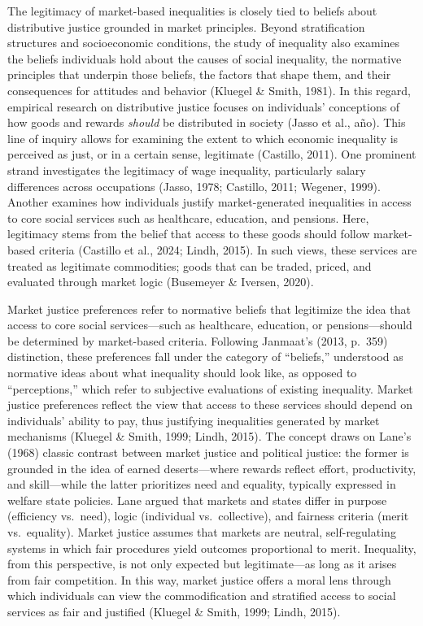 \documentclass[
  12pt,
]{article}
\begin{document}
The legitimacy of market-based inequalities is closely tied to beliefs
about distributive justice grounded in market principles. Beyond
stratification structures and socioeconomic conditions, the study of
inequality also examines the beliefs individuals hold about the causes
of social inequality, the normative principles that underpin those
beliefs, the factors that shape them, and their consequences for
attitudes and behavior (Kluegel \& Smith, 1981). In this regard,
empirical research on distributive justice focuses on individuals'
conceptions of how goods and rewards \emph{should} be distributed in
society (Jasso et al., año). This line of inquiry allows for examining
the extent to which economic inequality is perceived as just, or in a
certain sense, legitimate (Castillo, 2011). One prominent strand
investigates the legitimacy of wage inequality, particularly salary
differences across occupations (Jasso, 1978; Castillo, 2011; Wegener,
1999). Another examines how individuals justify market-generated
inequalities in access to core social services such as healthcare,
education, and pensions. Here, legitimacy stems from the belief that
access to these goods should follow market-based criteria (Castillo et
al., 2024; Lindh, 2015). In such views, these services are treated as
legitimate commodities; goods that can be traded, priced, and evaluated
through market logic (Busemeyer \& Iversen, 2020).

Market justice preferences refer to normative beliefs that legitimize
the idea that access to core social services---such as healthcare,
education, or pensions---should be determined by market-based criteria.
Following Janmaat's (2013, p.~359) distinction, these preferences fall
under the category of ``beliefs,'' understood as normative ideas about
what inequality should look like, as opposed to ``perceptions,'' which
refer to subjective evaluations of existing inequality. Market justice
preferences reflect the view that access to these services should depend
on individuals' ability to pay, thus justifying inequalities generated
by market mechanisms (Kluegel \& Smith, 1999; Lindh, 2015). The concept
draws on Lane's (1968) classic contrast between market justice and
political justice: the former is grounded in the idea of earned
deserts---where rewards reflect effort, productivity, and skill---while
the latter prioritizes need and equality, typically expressed in welfare
state policies. Lane argued that markets and states differ in purpose
(efficiency vs.~need), logic (individual vs.~collective), and fairness
criteria (merit vs.~equality). Market justice assumes that markets are
neutral, self-regulating systems in which fair procedures yield outcomes
proportional to merit. Inequality, from this perspective, is not only
expected but legitimate---as long as it arises from fair competition. In
this way, market justice offers a moral lens through which individuals
can view the commodification and stratified access to social services as
fair and justified (Kluegel \& Smith, 1999; Lindh, 2015).
\end{document}
